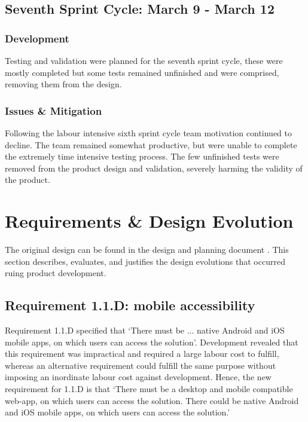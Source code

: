 \documentclass[9pt, titlepage]{extarticle}
\begin{document}
\subsection{Seventh Sprint Cycle: March 9 - March 12}

\subsubsection{Development}

Testing and validation were planned for the seventh sprint cycle, these were mostly completed but some tests remained unfinished and were comprised, removing them from the design.
 
\subsubsection{Issues \& Mitigation}

Following the labour intensive sixth sprint cycle team motivation continued to decline. The team remained somewhat productive, but were unable to complete the extremely time intensive testing process. The few unfinished tests were removed from the product design and validation, severely harming the validity of the product.

\section{Requirements \& Design Evolution}

The original design can be found in the design and planning document \cite{design-and-planning}. This section describes, evaluates, and justifies the design evolutions that occurred ruing product development. 

\subsection{Requirement 1.1.D: mobile accessibility}

Requirement 1.1.D \cite{requirements-analysis} specified that ‘There must be ... native Android and iOS mobile apps, on which users can access the solution’. Development revealed that this requirement was impractical and required a large labour cost to fulfill, whereas an alternative requirement could fulfill the same purpose without imposing an inordinate labour cost against development. Hence, the new requirement for 1.1.D is that ‘There must be a desktop and mobile compatible web-app, on which users can access the solution. There could be native Android and iOS mobile apps, on which users can access the solution.’\\
\end{document}
